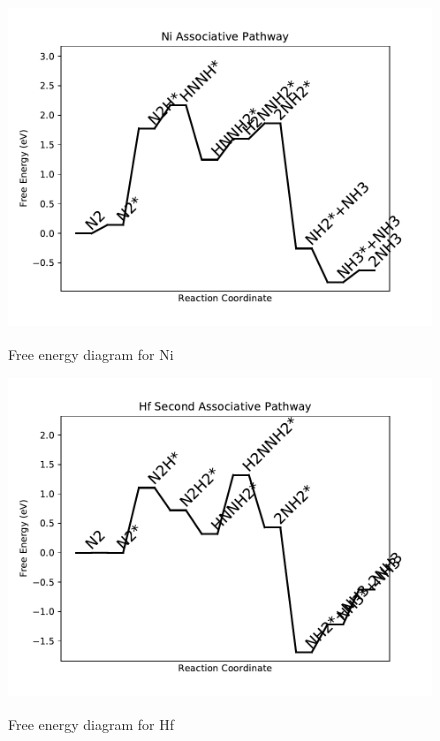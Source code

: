 \documentclass{article}
\begin{document}
\begin{figure}
\includegraphics[width=1\linewidth]{data/plots/Ni_associative.pdf}
\label{fig:Ni_associative}
\caption{Free energy diagram for Ni}
\end{figure}

\clearpage
\begin{figure}
\includegraphics[width=1\linewidth]{data/plots/Hf_associative_2.pdf}
\label{fig:Hf_associative_2}
\caption{Free energy diagram for Hf}
\end{figure}
\end{document}
